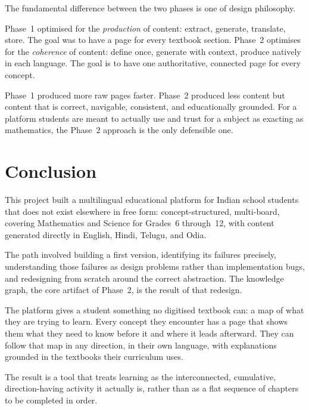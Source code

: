 \documentclass[12pt,a4paper]{article}
\begin{document}
The fundamental difference between the two phases is one of design philosophy.

Phase~1 optimised for the \emph{production} of content: extract, generate, translate, store.
The goal was to have a page for every textbook section.
Phase~2 optimises for the \emph{coherence} of content: define once, generate with context,
produce natively in each language.
The goal is to have one authoritative, connected page for every concept.

Phase~1 produced more raw pages faster.
Phase~2 produced less content but content that is correct, navigable, consistent,
and educationally grounded.
For a platform students are meant to actually use and trust for a subject as
exacting as mathematics, the Phase~2 approach is the only defensible one.

\section{Conclusion}

This project built a multilingual educational platform for Indian school students
that does not exist elsewhere in free form: concept-structured, multi-board,
covering Mathematics and Science for Grades~6 through~12,
with content generated directly in English, Hindi, Telugu, and Odia.

The path involved building a first version, identifying its failures precisely,
understanding those failures as design problems rather than implementation bugs,
and redesigning from scratch around the correct abstraction.
The knowledge graph, the core artifact of Phase~2, is the result of that redesign.

The platform gives a student something no digitised textbook can:
a map of what they are trying to learn.
Every concept they encounter has a page that shows them what they need to know before it
and where it leads afterward.
They can follow that map in any direction, in their own language,
with explanations grounded in the textbooks their curriculum uses.

The result is a tool that treats learning as the interconnected, cumulative, direction-having
activity it actually is, rather than as a flat sequence of chapters to be completed
in order.
\end{document}

